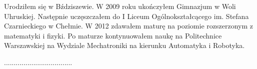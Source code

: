 Urodziłem się w Bździszewie.
W 2009 roku ukończyłem Gimnazjum w Woli Uhruskiej.
Następnie uczęszczałem do I Liceum Ogólnokształcącego im. Stefana Czarnieckiego w Chełmie.
W 2012 zdawałem maturę na poziomie rozszerzonym z matematyki i fizyki. 
Po maturze kontynuowałem naukę na Politechnice Warszawskiej na Wydziale Mechatroniki na kierunku Automatyka i Robotyka. 

\vspace{2cm}

\begin{flushright}
	\noindent...................................
\end{flushright}
